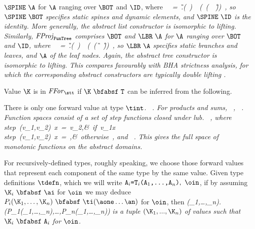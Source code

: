 $\SPINE~\A$ for $\A$ ranging over $\BOT$ and $\ID$, where
\beqs
\it \SPINE\ \A\ =\ \mu\G.(\ \ID)\ \glb\ (\ (\A\ \x\ \G))\ ,
\eeqs
so $\SPINE\ \BOT$ specifies static spines and dynamic elements, and
$\SPINE\ \ID$ is the identity.  More generally, the abstract list
constructor is isomorphic to lifting.  Similarly,
${\it{}FProj}_{\subtypespace{\makebox{\subtypesize\tt FunTree}} }$
comprises $\BOT$ and $\LBR\ \A$ for $\A$ ranging over $\BOT$ and $\ID$, where
\beqs
\it \LBR\ \A\ =\ \mu\G.(\ \A)\ \glb\ (\ (\G\ \x\ \G))\ ,
\eeqs
so $\LBR\ \A$ specifies static branches and leaves, and $\A$ of the
leaf nodes.  Again, the abstract tree constructor is isomorphic to
lifting.  This compares favourably with
BHA strictness analysis, for which the corresponding abstract
constructors are typically {\it double\/} lifting \cite{Wad87,Sew93}.


Value $\K$ is in ${\it{}FFor}_{\subtypespace\stt}$ if $\K~\bfabsf~\mbox{\tt T}$ can be
inferred from the following.

There is only one forward value at type $\tint$.
\beqs
\it \axm{()\ {}\ \bfabsf\ {}\ \tint}\ .
\eeqs
For products and sums,
\beqs
\it {}\ ,
\eeqs
\beqs
\it {}\ .
\eeqs
Function spaces consist of a set of step functions closed under lub.
\beqs
\it {}\ ,
\eeqs
where
\beqs
\it step\ (v_{\rm1},v_{\rm2})\ x\ =\ v_{\rm2},&\it {\rm\ if}\ v_{\rm1}\we{}x\\
\it step\ (v_{\rm1},v_{\rm2})\ x\ =\ \bot,&\it {\rm\ otherwise}\ ,
\eeqs
and
\beqs
\it {}\ .
\eeqs
This gives the full space of monotonic functions on the abstract
domains.

For recursively-defined types, roughly speaking, we choose those
forward values that represent each component of the same type by the
same value.  Given type definitions $\tdefn$, which we will write
$\mbox{\tt A}_i\mbox{\tt =T}_i\mbox{\tt (A}_1\mbox{\tt ,...,A}_n\mbox{\tt )},\ \oin$, if by assuming
$\K_i~\bfabsf~\ai$ for $\oin$ we may deduce
$P_i(\K_1,\ldots,\K_n)~\bfabsf~\ti(\aone\ldots\an)$ for $\oin$, then
\beqs
\it \mu(\K_{\rm1},\ldots ,\K_n).(P_{\rm1}(\K_{\rm1},\ldots ,\K_n),\ldots ,P_n(\K_{\rm1},\ldots ,\K_n))
\eeqs
is a tuple $(\K_1,...,\K_n)$ of values such that $\K_i\ \bfabsf\ \mbox{\tt A}_i$
for $\oin$.


